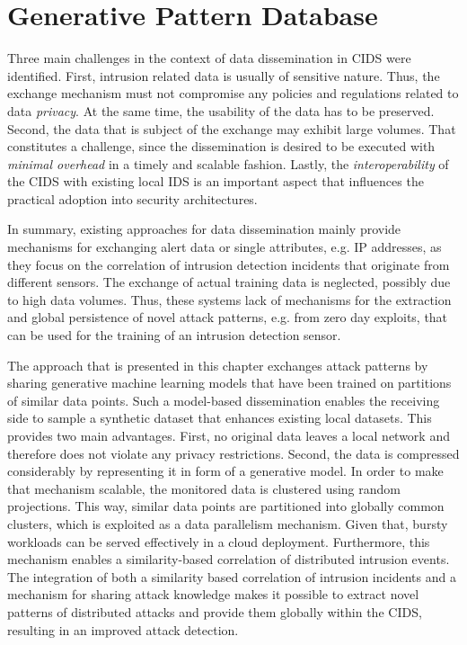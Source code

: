 \chapter{Generative Pattern Database}
Three main challenges in the context of data dissemination in CIDS were identified. First, intrusion related data is usually of sensitive nature. Thus, the exchange mechanism must not compromise any policies and regulations related to data \textit{privacy}. At the same time, the usability of the data has to be preserved. Second, the data that is subject of the exchange may exhibit large volumes. That constitutes a challenge, since the dissemination is desired to be executed with \textit{minimal overhead} in a timely and scalable fashion. Lastly, the \textit{interoperability} of the CIDS with existing local IDS is an important aspect that influences the practical adoption into security architectures.

In summary, existing approaches for data dissemination mainly provide mechanisms for exchanging alert data or single attributes, e.g. IP addresses, as they focus on the correlation of intrusion detection incidents that originate from different sensors. The exchange of actual training data is neglected, possibly due to high data volumes. Thus, these systems lack of mechanisms for the extraction and global persistence of novel attack patterns, e.g. from zero day exploits, that can be used for the training of an intrusion detection sensor.

The approach that is presented in this chapter exchanges attack patterns by sharing generative machine learning models that have been trained on partitions of similar data points. Such a model-based dissemination enables the receiving side to sample a synthetic dataset that enhances existing local datasets. This provides two main advantages. First, no original data leaves a local network and therefore does not violate any privacy restrictions. Second, the data is compressed considerably by representing it in form of a generative model. In order to make that mechanism scalable, the monitored data is clustered using random projections. This way, similar data points are partitioned into globally common clusters, which is exploited as a data parallelism mechanism. Given that, bursty workloads can be served effectively in a cloud deployment. Furthermore, this mechanism enables a similarity-based correlation of distributed intrusion events. The integration of both a similarity based correlation of intrusion incidents and a mechanism for sharing attack knowledge makes it possible to extract novel patterns of distributed attacks and provide them globally within the CIDS, resulting in an improved attack detection.

